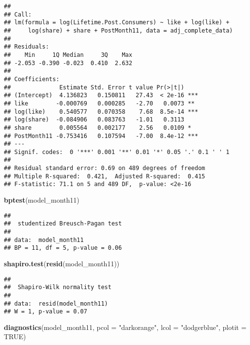 \documentclass[
]{article}
\newenvironment{Shaded}{\begin{snugshade}}{\end{snugshade}}
\newcommand{\DataTypeTok}[1]{\textcolor[rgb]{0.13,0.29,0.53}{#1}}
\newcommand{\KeywordTok}[1]{\textcolor[rgb]{0.13,0.29,0.53}{\textbf{#1}}}
\newcommand{\NormalTok}[1]{#1}
\newcommand{\OtherTok}[1]{\textcolor[rgb]{0.56,0.35,0.01}{#1}}
\newcommand{\StringTok}[1]{\textcolor[rgb]{0.31,0.60,0.02}{#1}}
\begin{document}
\begin{verbatim}
## 
## Call:
## lm(formula = log(Lifetime.Post.Consumers) ~ like + log(like) + 
##     log(share) + share + PostMonth11, data = adj_complete_data)
## 
## Residuals:
##    Min     1Q Median     3Q    Max 
## -2.053 -0.390 -0.023  0.410  2.632 
## 
## Coefficients:
##              Estimate Std. Error t value Pr(>|t|)    
## (Intercept)  4.136823   0.150811   27.43  < 2e-16 ***
## like        -0.000769   0.000285   -2.70   0.0073 ** 
## log(like)    0.540577   0.070358    7.68  8.5e-14 ***
## log(share)  -0.084906   0.083763   -1.01   0.3113    
## share        0.005564   0.002177    2.56   0.0109 *  
## PostMonth11 -0.753416   0.107594   -7.00  8.4e-12 ***
## ---
## Signif. codes:  0 '***' 0.001 '**' 0.01 '*' 0.05 '.' 0.1 ' ' 1
## 
## Residual standard error: 0.69 on 489 degrees of freedom
## Multiple R-squared:  0.421,  Adjusted R-squared:  0.415 
## F-statistic: 71.1 on 5 and 489 DF,  p-value: <2e-16
\end{verbatim}

\begin{Shaded}
\begin{Highlighting}[]
\KeywordTok{bptest}\NormalTok{(model_month11)}
\end{Highlighting}
\end{Shaded}

\begin{verbatim}
## 
##  studentized Breusch-Pagan test
## 
## data:  model_month11
## BP = 11, df = 5, p-value = 0.06
\end{verbatim}

\begin{Shaded}
\begin{Highlighting}[]
\KeywordTok{shapiro.test}\NormalTok{(}\KeywordTok{resid}\NormalTok{(model_month11))}
\end{Highlighting}
\end{Shaded}

\begin{verbatim}
## 
##  Shapiro-Wilk normality test
## 
## data:  resid(model_month11)
## W = 1, p-value = 0.07
\end{verbatim}

\begin{Shaded}
\begin{Highlighting}[]
\KeywordTok{diagnostics}\NormalTok{(model_month11, }\DataTypeTok{pcol =} \StringTok{"darkorange"}\NormalTok{, }\DataTypeTok{lcol =} \StringTok{"dodgerblue"}\NormalTok{, }\DataTypeTok{plotit =} \OtherTok{TRUE}\NormalTok{)}
\end{Highlighting}
\end{Shaded}
\end{document}
